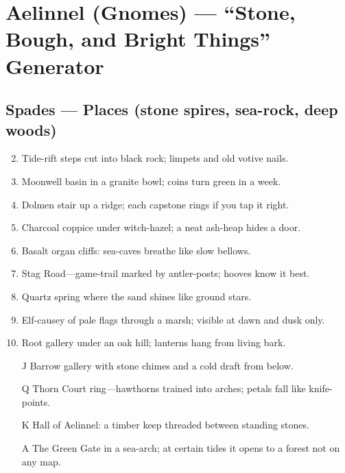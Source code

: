 \chapter{Aelinnel (Gnomes) --- ``Stone, Bough, and Bright Things'' Generator}
\label{chap:aelinnel}

\section*{Spades --- Places (stone spires, sea-rock, deep woods)}
\label{sec:aelinnel-places}
\begin{enumerate}
\setcounter{enumi}{1}
\item Tide-rift steps cut into black rock; limpets and old votive nails.
\item Moonwell basin in a granite bowl; coins turn green in a week.
\item Dolmen stair up a ridge; each capstone rings if you tap it right.
\item Charcoal coppice under witch-hazel; a neat ash-heap hides a door.
\item Basalt organ cliffs: sea-caves breathe like slow bellows.
\item Stag Road---game-trail marked by antler-posts; hooves know it best.
\item Quartz spring where the sand shines like ground stars.
\item Elf-causey of pale flags through a marsh; visible at dawn and dusk only.
\item Root gallery under an oak hill; lanterns hang from living bark.
\item[J] Barrow gallery with stone chimes and a cold draft from below.
\item[Q] Thorn Court ring---hawthorns trained into arches; petals fall like knife-points.
\item[K] Hall of Aelinnel: a timber keep threaded between standing stones.
\item[A] The Green Gate in a sea-arch; at certain tides it opens to a forest not on any map.
\end{enumerate}


